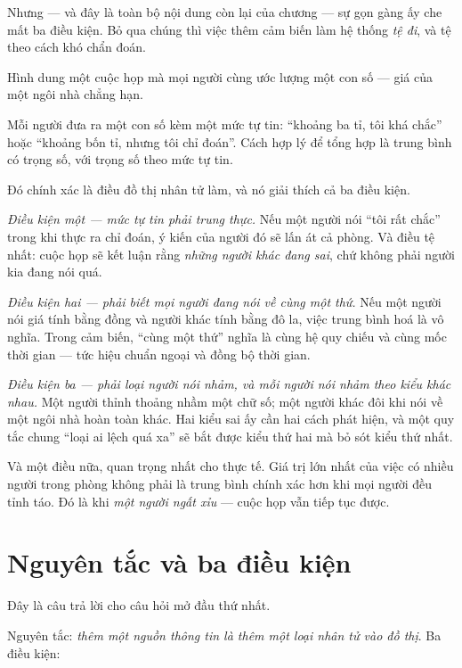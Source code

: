 \documentclass[../../vslam.tex]{subfiles}
\begin{document}
Nhưng --- và đây là toàn bộ nội dung còn lại của chương --- sự gọn gàng ấy che mất ba điều kiện. Bỏ qua chúng thì việc thêm cảm biến làm hệ thống \emph{tệ đi}, và tệ theo cách khó chẩn đoán.

\begin{trucgiac}
Hình dung một cuộc họp mà mọi người cùng ước lượng một con số --- giá của một ngôi nhà chẳng hạn.

Mỗi người đưa ra một con số kèm một mức tự tin: ``khoảng ba tỉ, tôi khá chắc'' hoặc ``khoảng bốn tỉ, nhưng tôi chỉ đoán''. Cách hợp lý để tổng hợp là trung bình có trọng số, với trọng số theo mức tự tin.

Đó chính xác là điều đồ thị nhân tử làm, và nó giải thích cả ba điều kiện.

\emph{Điều kiện một --- mức tự tin phải trung thực.} Nếu một người nói ``tôi rất chắc'' trong khi thực ra chỉ đoán, ý kiến của người đó sẽ lấn át cả phòng. Và điều tệ nhất: cuộc họp sẽ kết luận rằng \emph{những người khác đang sai}, chứ không phải người kia đang nói quá.

\emph{Điều kiện hai --- phải biết mọi người đang nói về cùng một thứ.} Nếu một người nói giá tính bằng đồng và người khác tính bằng đô la, việc trung bình hoá là vô nghĩa. Trong cảm biến, ``cùng một thứ'' nghĩa là cùng hệ quy chiếu và cùng mốc thời gian --- tức hiệu chuẩn ngoại và đồng bộ thời gian.

\emph{Điều kiện ba --- phải loại người nói nhảm, và mỗi người nói nhảm theo kiểu khác nhau.} Một người thỉnh thoảng nhầm một chữ số; một người khác đôi khi nói về một ngôi nhà hoàn toàn khác. Hai kiểu sai ấy cần hai cách phát hiện, và một quy tắc chung ``loại ai lệch quá xa'' sẽ bắt được kiểu thứ hai mà bỏ sót kiểu thứ nhất.

Và một điều nữa, quan trọng nhất cho thực tế. Giá trị lớn nhất của việc có nhiều người trong phòng không phải là trung bình chính xác hơn khi mọi người đều tỉnh táo. Đó là khi \emph{một người ngất xỉu} --- cuộc họp vẫn tiếp tục được.
\end{trucgiac}

\section{Nguyên tắc và ba điều kiện}

Đây là câu trả lời cho câu hỏi mở đầu thứ nhất.

Nguyên tắc: \emph{thêm một nguồn thông tin là thêm một loại nhân tử vào đồ thị}. Ba điều kiện:
\end{document}
